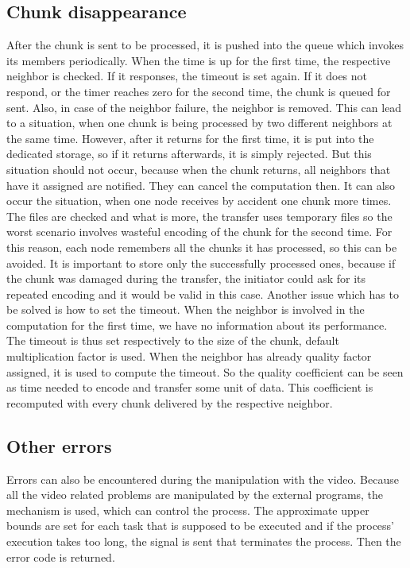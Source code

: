 \subsection*{Chunk disappearance}

After the chunk is sent to be processed, it is pushed into the queue
which invokes its members periodically. When the time is up for the
first time, the respective neighbor is checked. If it responses, the
timeout is set again. If it does not respond, or the timer reaches zero
for the second time, the chunk is queued for sent. Also, in case of the
neighbor failure, the neighbor is removed. This can lead to a situation,
when one chunk is being processed by two different neighbors at the same
time. However, after it returns for the first time, it is put into the
dedicated storage, so if it returns afterwards, it is simply rejected.
But this situation should not occur, because when the chunk returns, all
neighbors that have it assigned are notified. They can cancel the
computation then. It can also occur the situation, when one node
receives by accident one chunk more times. The files are checked and
what is more, the transfer uses temporary files so the worst scenario
involves wasteful encoding of the chunk for the second time. For this
reason, each node remembers all the chunks it has processed, so this can
be avoided. It is important to store only the successfully processed
ones, because if the chunk was damaged during the transfer, the
initiator could ask for its repeated encoding and it would be valid in
this case. Another issue which has to be solved is how to set the
timeout. When the neighbor is involved in the computation for the first
time, we have no information about its performance. The timeout is thus
set respectively to the size of the chunk, default multiplication factor
is used. When the neighbor has already quality factor assigned, it is
used to compute the timeout. So the quality coefficient can be seen as
time needed to encode and transfer some unit of data. This coefficient
is recomputed with every chunk delivered by the respective neighbor.

\subsection*{Other errors}

Errors can also be encountered during the manipulation with the video.
Because all the video related problems are manipulated by the external
programs, the mechanism is used, which can control the process. The
approximate upper bounds are set for each task that is supposed to be
executed and if the process' execution takes too long, the signal is
sent that terminates the process. Then the error code is returned.
